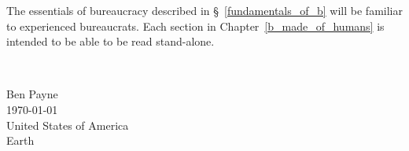 The essentials of bureaucracy described in \S~\ref{fundamentals_of_b} will be familiar to experienced bureaucrats. Each section in Chapter~\ref{b_made_of_humans} is intended to be able to be read stand-alone. %

\ \\

\begin{flushright}
Ben Payne\\
\today\\
United States of America\\
Earth
\end{flushright}


